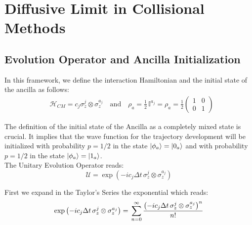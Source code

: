 \documentclass[a4paper,12pt]{article}
\begin{document}
	\clearpage
	\newpage

	\section{Diffusive Limit in Collisional Methods}
	\label{sec:Diffusive_Limit_in_Collisional_Methods}

	\subsection{Evolution Operator and Ancilla Initialization}
	\label{sub:Evolution_Operator_and_Ancilla_Initialization_Diff}

	In this framework, we define the interaction Hamiltonian and the initial state of the ancilla as follows:
	\begin{align}
		&\mathcal{H}_{CM} = c_{j} \sigma_{z}^{j} \otimes \sigma_{z}^{a_j} \quad \text{and} \quad \rho_{a} = \frac{1}{2} \, \mathbb{I}^{a_j} =\rho_{a} = \frac{1}{2} \begin{pmatrix} 1 & 0 \\ 0 & 1 \end{pmatrix}
		\label{eq:Diff_initialization}
	\end{align}

	The definition of the initial state of the Ancilla as a completely mixed state is crucial. It implies that the wave function for the trajectory development will be initialized with probability $p=1/2$ in the state $ \ket{\phi_a} = \ket{0_a} $ and with probability $p=1/2$ in the state $ \ket{\phi_a} = \ket{1_a} $. \\

	The Unitary Evolution Operator reads:
	\begin{equation}
		\mathcal{U} = \exp{\left( -i c_j \Delta t \, \sigma_{z}^{j} \otimes \sigma_{z}^{a_j} \right)}
		\label{eq:U_Diff}
	\end{equation}

	First we expand in the Taylor's Series the exponential which reads:
	\begin{equation}
		\exp{\left( -i c_j \Delta t \, \sigma_{z}^{j} \otimes \sigma_{z}^{a_j} \right)} = \, \sum_{n=0}^{\infty}{\frac{\left( -i c_j \Delta t \, \sigma_{z}^{j} \otimes \sigma_{z}^{a_j} \right)^n}{n!} } \\
		\label{eq:exp_decomposition}
	\end{equation}
\end{document}
